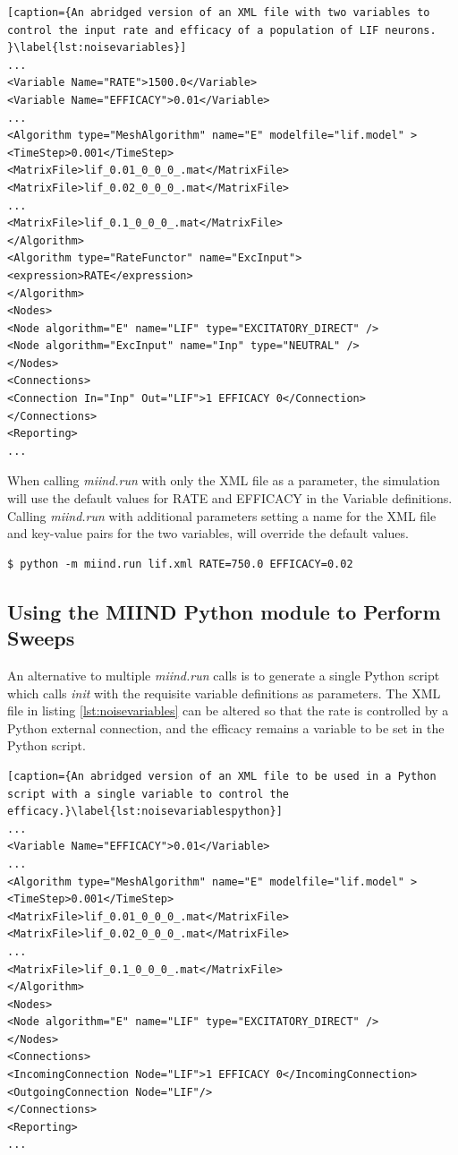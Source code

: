 \documentclass[utf8]{frontiers_suppmat} %
\begin{document}
\begin{lstlisting}[caption={An abridged version of an XML file with two variables to control the input rate and efficacy of a population of LIF neurons.  }\label{lst:noisevariables}]
...
<Variable Name="RATE">1500.0</Variable>
<Variable Name="EFFICACY">0.01</Variable>
...
<Algorithm type="MeshAlgorithm" name="E" modelfile="lif.model" >
<TimeStep>0.001</TimeStep>
<MatrixFile>lif_0.01_0_0_0_.mat</MatrixFile>
<MatrixFile>lif_0.02_0_0_0_.mat</MatrixFile>
...
<MatrixFile>lif_0.1_0_0_0_.mat</MatrixFile>
</Algorithm>
<Algorithm type="RateFunctor" name="ExcInput">
<expression>RATE</expression>
</Algorithm>
<Nodes>
<Node algorithm="E" name="LIF" type="EXCITATORY_DIRECT" />
<Node algorithm="ExcInput" name="Inp" type="NEUTRAL" />
</Nodes>
<Connections>
<Connection In="Inp" Out="LIF">1 EFFICACY 0</Connection>
</Connections>
<Reporting>
...
\end{lstlisting}

When calling \textit{miind.run} with only the XML file as a parameter, the simulation will use the default values for RATE and EFFICACY in the Variable definitions. Calling \textit{miind.run} with additional parameters setting a name for the XML file and key-value pairs for the two variables, will override the default values.

\begin{lstlisting}
$ python -m miind.run lif.xml RATE=750.0 EFFICACY=0.02
\end{lstlisting}

\subsection{Using the MIIND Python module to Perform Sweeps}
An alternative to multiple \textit{miind.run} calls is to generate a single Python script which calls \textit{init} with the requisite variable definitions as parameters. The XML file in listing \ref{lst:noisevariables} can be altered so that the rate is controlled by a Python external connection, and the efficacy remains a variable to be set in the Python script.

\begin{lstlisting}[caption={An abridged version of an XML file to be used in a Python script with a single variable to control the efficacy.}\label{lst:noisevariablespython}]
...
<Variable Name="EFFICACY">0.01</Variable>
...
<Algorithm type="MeshAlgorithm" name="E" modelfile="lif.model" >
<TimeStep>0.001</TimeStep>
<MatrixFile>lif_0.01_0_0_0_.mat</MatrixFile>
<MatrixFile>lif_0.02_0_0_0_.mat</MatrixFile>
...
<MatrixFile>lif_0.1_0_0_0_.mat</MatrixFile>
</Algorithm>
<Nodes>
<Node algorithm="E" name="LIF" type="EXCITATORY_DIRECT" />
</Nodes>
<Connections>
<IncomingConnection Node="LIF">1 EFFICACY 0</IncomingConnection>
<OutgoingConnection Node="LIF"/>
</Connections>
<Reporting>
...
\end{lstlisting}
\end{document}
